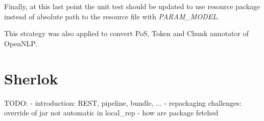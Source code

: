 \documentclass{article}
\newcommand{\id}[1]{\mbox{\textit{#1}}}
\begin{document}
Finally, at this last point the unit test should be updated to use resource package instead of absolute path to the resource file with \id{PARAM\_MODEL}.

This strategy was also applied to convert PoS, Token and Chunk annotator of OpenNLP.


\section{Sherlok}

TODO:
- introduction: REST, pipeline, bundle, ...
- repackaging challenges: override of jar not automatic in local\_rep
- how are package fetched

\end{document}
